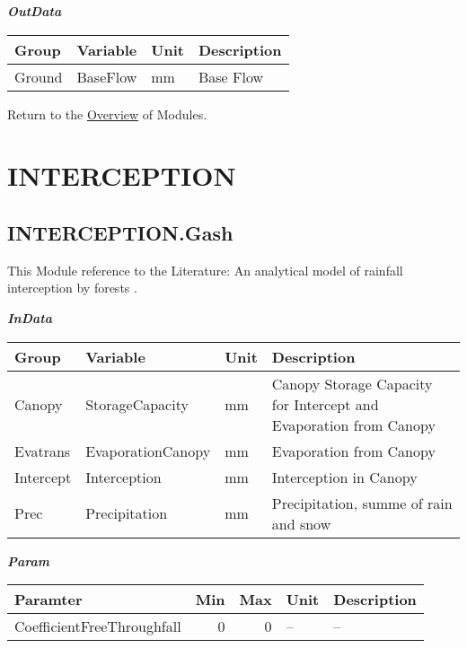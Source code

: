 \documentclass[
]{book}
\begin{document}
\textbf{\emph{OutData}}

\begin{table}[!h]
\centering
\begin{tabular}{l|l|l|l}
\hline
Group & Variable & Unit & Description\\
\hline
Ground & BaseFlow & mm & Base Flow\\
\hline
\end{tabular}
\end{table}

Return to the \protect\hyperlink{module}{Overview} of Modules.

\hypertarget{INTERCEPTION}{%
\section{INTERCEPTION}\label{INTERCEPTION}}

\hypertarget{INTERCEPTION.Gash}{%
\subsection{INTERCEPTION.Gash}\label{INTERCEPTION.Gash}}

This Module reference to the Literature: An analytical model of rainfall interception by forests \citep{Gash.1979}.

\textbf{\emph{InData}}

\begin{table}[!h]
\centering
\begin{tabular}{l|l|l|l}
\hline
Group & Variable & Unit & Description\\
\hline
Canopy & StorageCapacity & mm & Canopy Storage Capacity for Intercept and Evaporation from Canopy\\
\cline{1-4}
Evatrans & EvaporationCanopy & mm & Evaporation from Canopy\\
\cline{1-4}
Intercept & Interception & mm & Interception in Canopy\\
\cline{1-4}
Prec & Precipitation & mm & Precipitation, summe of rain and snow\\
\hline
\end{tabular}
\end{table}

\textbf{\emph{Param}}

\begin{table}[!h]
\centering
\begin{tabular}{l|r|r|l|l}
\hline
Paramter & Min & Max & Unit & Description\\
\hline
CoefficientFreeThroughfall & 0 & 0 & -- & --\\
\hline
\end{tabular}
\end{table}
\end{document}
